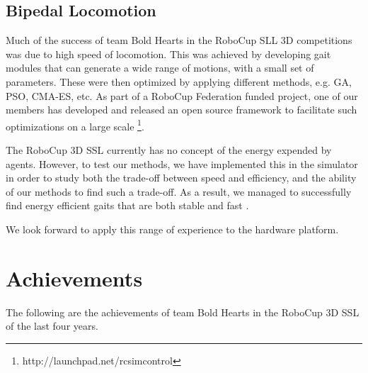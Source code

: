 \documentclass{llncs}
\begin{document}
\subsection{Bipedal Locomotion}
\label{sec:bipedal-locomotion}

Much of the success of team Bold Hearts in the RoboCup SLL 3D
competitions was due to high speed of locomotion. This was achieved by
developing gait modules that can generate a wide range of motions,
with a small set of parameters. These were then optimized by applying
different methods, e.g. GA, PSO, CMA-ES, etc. As part of a RoboCup
Federation funded project, one of our members has developed and
released an open source framework to facilitate such optimizations on
a large scale \footnote{http://launchpad.net/rcsimcontrol}.

The RoboCup 3D SSL currently has no concept of the energy expended by agents.
However, to test our methods, we have implemented this in the
simulator in order to study both the trade-off between speed and
efficiency, and the ability of our methods to find such a
trade-off. As a result, we managed to successfully find energy efficient
gaits that are both stable and fast
\cite{lattarulo_application_2011}.

We look forward to apply this range of experience to the hardware
platform.

\section{Achievements}
\label{sec:achievements}

The following are the achievements of team Bold Hearts in the RoboCup 3D SSL of the last four years.
\end{document}
